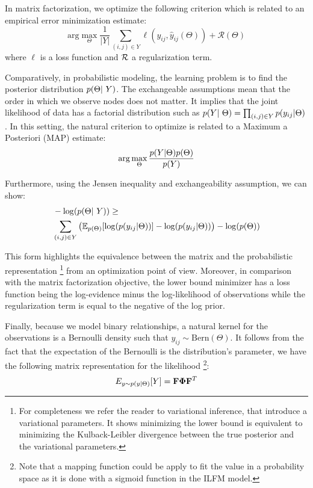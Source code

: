 In matrix factorization, we optimize the following criterion which is related to an empirical error minimization estimate:
\begin{displaymath}
    \mathrm{arg}\max\limits_{\Theta} \frac{1}{|Y|} \sum_{(i,j) \in Y} \ell(y_{ij}, \hat y_{ij}(\Theta)) + \mathcal{R}(\Theta)
\end{displaymath}
where $\ell$ is a loss function and $\cal R$ a regularization term.

Comparatively, in probabilistic modeling, the learning problem is to find the posterior distribution $\p(\Theta | Y)$. The exchangeable assumptions mean that the order in which we observe nodes does not matter. It implies that the joint likelihood of data has a factorial distribution such as $\p(Y | \Theta) = \prod_{(i,j) \in Y} \p(y_{ij}| \Theta)$. In this setting, the natural criterion to optimize is related to a Maximum a Posteriori (MAP) estimate: 
\begin{displaymath}
    \mathrm{arg}\max\limits_{\Theta}  \frac{p(Y | \Theta) p(\Theta)}{p(Y)} 
\end{displaymath}

Furthermore, using the Jensen inequality and exchangeability assumption, we can show:
\begin{align}
    &- \log(\p(\Theta | Y)) \geq \nonumber \\  
    &\sum_{(i,j) \in Y} \left( \E_{p(\Theta)}[\log(\p(y_{ij}|\Theta))] - \log(\p(y_{ij}|\Theta)) \right) - \log(\p(\Theta))
\end{align}	


This form highlights the equivalence between the matrix and the probabilistic representation \footnote{For completeness we refer the reader to variational inference, that introduce a variational parameters. It shows minimizing the lower bound is equivalent to minimizing the Kulback-Leibler divergence between the true posterior and the variational parameters.} from an optimization point of view. Moreover, in comparison with the  matrix factorization objective, the lower bound minimizer has a loss function being the log-evidence minus the log-likelihood of observations while the regularization term is equal to the negative of the log prior.


Finally, because we model binary relationships, a natural kernel for the observations is a Bernoulli density such that $y_{ij} \sim \text{Bern}(\Theta)$. It follows from the fact that the expectation of the Bernoulli is the distribution's parameter, we have the following matrix representation for the likelihood \footnote{Note that a mapping function could be apply to fit the value in a probability space as it is done with a sigmoid function in the ILFM model.}:
\begin{equation}
E_{y \sim p(y \mid \Theta)}[Y] = \mathbf{F} \mathbf{\Phi}  \mathbf{F}^T
\end{equation}

